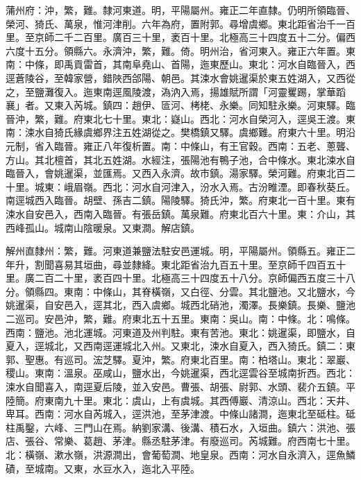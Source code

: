 \begin{pinyinscope}
蒲州府：沖，繁，難。隸河東道。明，平陽屬州。雍正二年直隸。仍明所領臨晉、榮河、猗氏、萬泉，惟河津削。六年為府，置附郭。尋增虞鄉。東北距省治千一百里。至京師二千二百里。廣百三十里，袤百十里。北極高三十四度五十二分。偏西六度十五分。領縣六。永濟沖，繁，難。倚。明州治，省河東入。雍正六年置。東南：中條，即禹貢雷首，其南阜堯山、首陽，迤東歷山。東北：河水自臨晉入，西逕蒼陵谷，至韓家營，錯陜西郃陽、朝邑。其涑水會姚暹渠於東五姓湖入，又西從之，至鹽灘復入。迤東南逕風陵渡，溈汭入焉，揚雄賦所謂「河靈矍踢，掌華蹈襄」者。又東入芮城。鎮四：趙伊、匼河、栲栳、永樂。同知駐永樂。河東驛。臨晉沖，繁，難。府東北七十里。東北：嶷山。西北：河水自榮河入，逕吳王渡。東南：涑水自猗氏緣虞鄉界注五姓湖從之。樊橋鎮又驛。虞鄉難。府東六十里。明沿元制，省入臨晉。雍正八年復析置。南：中條山，有王官穀。西南：五老、蔥聾、方山。其北檀首，其北五姓湖。水經注，張陽池有鴨子池，合中條水。東北涑水自臨晉入，會姚暹渠，並匯焉。又西入永濟。故市鎮。湯家驛。榮河難。府東北百二十里。城東：峨眉嶺。西北：河水自河津入，汾水入焉。古汾睢湮。即春秋葵丘。南逕城西入臨晉。胡壁、孫吉二鎮。陽陵驛。猗氏沖，繁。府東北一百十里。東有涑水自安邑入，西南入臨晉。有張岳鎮。萬泉難。府東北百六十里。東：介山，其西峰孤山。城南山陰暖泉。又東澗。解店鎮。

解州直隸州：繁，難。河東道兼鹽法駐安邑運城。明，平陽屬州。領縣五。雍正二年升，割聞喜易其垣曲，尋並隸絳。東北距省治九百五十里。至京師千四百五十里。廣二百二十里，袤百四十里。北極高三十四度五十八分。京師偏西五度三十八分。領縣四。東南：中條山，其脊橫嶺，又白徑、分雲。其北鹽池。又北鹽水，今姚暹渠，自安邑入，逕其北，西入虞鄉。城西北硝池，濁澤。長樂鎮。長樂、鹽池二巡司。安邑沖，繁，難。府東北五十五里。東南：吳山。南：中條。北：鳴條。西南：鹽池。池北運城。河東道及州判駐。東有苦池。東北：姚暹渠，即鹽水，自夏入，逕城北，又西南逕運城北入州。又東北，涑水自夏入，西入猗氏。鎮二：東郭、聖惠。有巡司。浤芝驛。夏沖，繁。府東北百里。南：柏塔山。東北：翠巖、稷山。東南：溫泉。巫咸山，鹽水出，今姚暹渠，西北逕雲谷至城南折西。西北：涑水自聞喜入，南逕夏后陵，並入安邑。曹張、胡張、尉郭、水頭、裴介五鎮。平陸簡。府東南九十里。東北：虞山，上有虞城。其西傅巖、清涼山。西北：天井、卑耳。西南：河水自芮城入，逕洪池，至茅津渡。中條山諸澗，迤東北至砥柱。砥柱禹鑿，六峰、三門山在焉。納劉家溝、後溝、積石水，入垣曲。鎮六：洪池、張店、張谷、常樂、葛趙、茅津。縣丞駐茅津。有廢巡司。芮城難。府西南七十里。北：橫嶺、漱水嶺，洪源澗出，會葡萄澗、地皇泉。西南：河水自永濟入，逕魚鱗磧，至城南。又東，水豆水入，迤北入平陸。


\end{pinyinscope}

